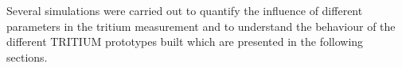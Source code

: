 Several simulations were carried out to quantify the influence of different parameters in the tritium measurement and to understand the behaviour of the different TRITIUM prototypes built which are presented in the following sections. 
